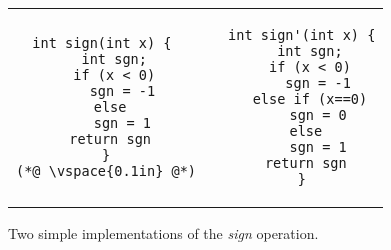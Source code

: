 \begin{figure}
\centering
\begin{tabular}{ccc}
\begin{lstlisting}
int sign(int x) { 
  int sgn;
  if (x < 0)
    sgn = -1
  else 
    sgn = 1
 return sgn
}
(*@ \vspace{0.1in} @*)
\end{lstlisting}
&
&
\begin{lstlisting}
int sign'(int x) {
  int sgn;
  if (x < 0)
    sgn = -1
  else if (x==0)
    sgn = 0
  else 
    sgn = 1
 return sgn
}
\end{lstlisting}
\\
\end{tabular}
\caption{Two simple implementations of the \emph{sign} operation.}
\end{figure}
